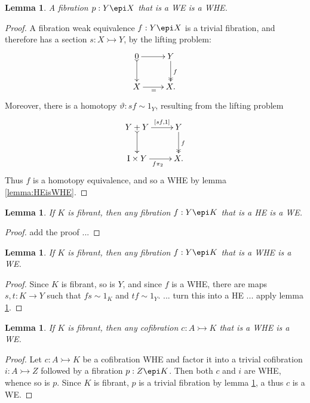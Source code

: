 \documentclass[11pt]{article}
\newcommand{\mono}{\ensuremath{\rightarrowtail}}
\newcommand{\ra}{\ensuremath{\rightarrow}}
\newcommand{\I}{\ensuremath{\mathrm{I}}}
\newtheorem{lemma}[theorem]{Lemma}
\theoremstyle{remark}
\theoremstyle{definition}
\begin{document}
\begin{lemma}\label{lemma:FibWEtoWHE}
A fibration $ p : Y \epi X$ that is a WE is a WHE.
\end{lemma}
\begin{proof}
A fibration weak equivalence $f : Y\epi X$ is a trivial fibration, and therefore has a section $s: X\mono Y$, by the lifting problem:
\begin{equation*}%
\xymatrix{
0 \ar@{>->}[d]_{} \ar[r] & Y \ar@{>>}[d]^{f} \\
X\ar[r]_{=} & X.
}
\end{equation*}
%
Moreover, there is a homotopy $\vartheta : sf \sim 1_Y$, resulting from the lifting problem
\begin{equation*}%
\xymatrix{
Y+Y \ar@{>->}[d]_{} \ar[r]^-{[sf, 1]}  & Y\ar@{>>}[d]^{f} \\
\I\times Y \ar[r]_{f\pi_2} & X.
}
\end{equation*}
Thus $f$ is a homotopy equivalence, and so a WHE by lemma \ref{lemma:HEisWHE}.
\end{proof}

\begin{lemma}\label{FibHETrivFib}
If $K$ is fibrant, then any fibration $f : Y \epi K$ that is a HE is a WE.
\end{lemma}
\begin{proof}
add the proof ...
\end{proof}

\begin{lemma}\label{FibWHEfibCodTrivFib}
If $K$ is fibrant, then any fibration $f : Y \epi K$ that is a WHE is a WE.
\end{lemma}
\begin{proof}
Since $K$ is fibrant, so is $Y$, and since $f$ is a WHE, there are maps $s, t: K\ra Y$ such that $fs \sim 1_K$ and $tf\sim 1_Y$. 
... turn this into a HE ... apply lemma \ref{FibHETrivFib}.
\end{proof}

\begin{lemma}\label{CofWHEfibCodTrivCof}
If $K$ is fibrant, then any cofibration $c : A \mono K$ that is a WHE is a WE.
\end{lemma}
\begin{proof}
Let $c : A \mono K$ be a cofibration WHE and factor it into a trivial cofibration $i : A\mono Z$ followed by a fibration $p: Z\epi K$.  Then both 
$c$ and $i$ are WHE, whence so is $p$.   Since $K$ is fibrant, $p$ is a trivial fibration by lemma \ref{FibWHEfibCodTrivFib}, a thus $c$ is a WE.  
\end{proof}
\end{document}
